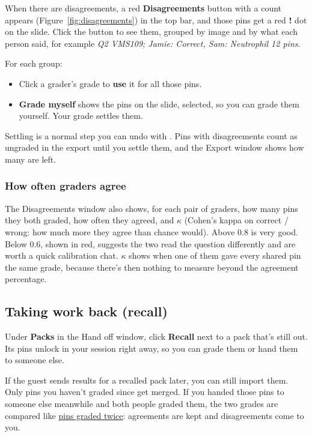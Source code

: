 When there are disagreements, a red \textbf{Disagreements} button with a count appears (Figure~\ref{fig:disagreements}) in the top bar, and those pins get a red \textbf{!} dot on the slide. Click the button to see them, grouped by image and by what each person said, for example \emph{Q2 \textperiodcentered{} VMS109; Jamie: \checksym{} Correct, Sam: \crosssym{} Neutrophil 12 pins}.

For each group:

\begin{itemize}[topsep=2pt, itemsep=2pt]
\item Click a grader's grade to \textbf{use} it for all those pins.
\item \textbf{Grade myself} shows the pins on the slide, selected, so you can grade them yourself. Your grade settles them.
\end{itemize}

Settling is a normal step you can undo with \keycap{\cmdsym{}}\keyplus{}. Pins with disagreements count as ungraded in the export until you settle them, and the Export window shows how many are left.

\subsubsection{How often graders agree}\label{sec:handoff:how-often-graders-agree}

The Disagreements window also shows, for each pair of graders, how many pins they both graded, how often they agreed, and \textbf{\ensuremath{\kappa}} (Cohen's kappa on correct / wrong: how much more they agree than chance would). Above 0.8 is very good. Below 0.6, shown in red, suggests the two read the question differently and are worth a quick calibration chat. \ensuremath{\kappa} shows when one of them gave every shared pin the same grade, because there's then nothing to measure beyond the agreement percentage.

\subsection{Taking work back (recall)}\label{sec:handoff:taking-work-back-recall}

Under \textbf{Packs} in the Hand off window, click \textbf{Recall} next to a pack that's still out. Its pins unlock in your session right away, so you can grade them or hand them to someone else.

If the guest sends results for a recalled pack later, you can still import them. Only pins you haven't graded since get merged. If you handed those pins to someone else meanwhile and both people graded them, the two grades are compared like \hyperref[sec:handoff:grade-some-pins-twice]{pins graded twice}: agreements are kept and disagreements come to you.

